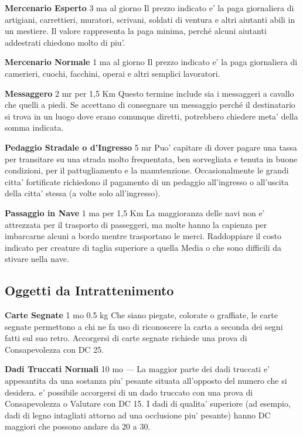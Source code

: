 \documentclass[a4paper,11pt,twoside,openany]{dndbook}
\begin{document}
{\textbf{Mercenario Esperto} 3 ma al giorno Il prezzo indicato e' la paga giornaliera di artigiani, carrettieri, muratori, scrivani, soldati di ventura e altri aiutanti abili in un mestiere. Il valore rappresenta la paga minima, perché alcuni aiutanti addestrati chiedono molto di piu'.

\textbf{Mercenario Normale} 1 ma al giorno Il prezzo indicato e' la paga giornaliera di camerieri, cuochi, facchini, operai e altri semplici lavoratori.

\textbf{Messaggero} 2 mr per 1,5 Km Questo termine include sia i messaggeri a cavallo che quelli a piedi. Se accettano di consegnare un messaggio perché il destinatario si trova in un luogo dove erano comunque diretti, potrebbero chiedere meta' della somma indicata.

\textbf{Pedaggio Stradale o d'Ingresso} 5 mr Puo' capitare di dover pagare una tassa per transitare su una strada molto frequentata, ben sorvegliata e tenuta in buone condizioni, per il pattugliamento e la manutenzione. Occasionalmente le grandi citta' fortificate richiedono il pagamento di un pedaggio all'ingresso o all'uscita della citta' stessa (a volte solo all'ingresso).

\textbf{Passaggio in Nave} 1 ma per 1,5 Km La maggioranza delle navi non e' attrezzata per il trasporto di passeggeri, ma molte hanno la capienza per imbarcarne alcuni a bordo mentre trasportano le merci. Raddoppiare il costo indicato per creature di taglia superiore a quella Media o che sono difficili da stivare nella nave.

\subsection{Oggetti da Intrattenimento}

\label{oggetti-da-intrattenimento}

\textbf{Carte Segnate} 1 mo 0.5 kg Che siano piegate, colorate o graffiate, le carte segnate permettono a chi ne fa uso di riconoscere la carta a seconda dei segni fatti sul suo retro. Accorgersi di carte segnate richiede una prova di Consapevolezza con DC 25.

\textbf{Dadi Truccati Normali} 10 mo --- La maggior parte dei dadi truccati e' appesantita da una sostanza piu' pesante situata all'opposto del numero che si desidera. e' possibile accorgersi di un dado truccato con una prova di Consapevolezza o Valutare con DC 15. I dadi di qualita' superiore (ad esempio, dadi di legno intagliati attorno ad una occlusione piu' pesante) hanno DC maggiori che possono andare da 20 a 30.

}
\end{document}
